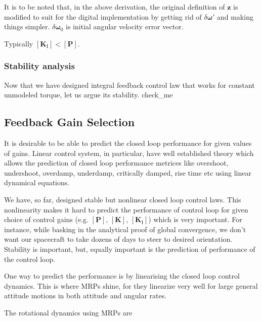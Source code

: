 \documentclass{article}
\begin{document}
It is to be noted that, in the above derivation, the original definition of $\bm{z}$ is modified to suit for the digital implementation by getting rid of $\delta\bm{\omega}'$ and making things simpler. $\delta\bm{\omega}_{0}$ is initial angular velocity error vector. 

Typically $[\bm{K}_{\text{I}}]<[\bm{P}]$.

\subsubsection{Stability analysis}

Now that we have designed integral feedback control law that works for constant unmodeled torque, let us argue its stability. check\_me

\subsection{Feedback Gain Selection}

It is desirable to be able to predict the closed loop performance for given values of gains. Linear control system, in particular, have well established theory which allows the prediction of closed loop performance metrices like overshoot, undershoot, overdamp, underdamp, critically damped, rise time etc using linear dynamical equations.

We have, so far, designed stable but nonlinear closed loop control laws. This nonlinearity makes it hard to predict the performance of control loop for given choice of control gains (e.g. $[\bm{P}]$, $[\bm{K}]$, $[\bm{K}_{\text{I}}]$) which is very important. For instance, while basking in the analytical proof of global convergence, we don't want our spacecraft to take dozens of days to steer to desired orientation. Stability is important, but, equally important is the prediction of performance of the control loop. 

One way to predict the performance is by linearising the closed loop control dynamics. This is where MRPs shine, for they linearize very well for large general attitude motions in both attitude and angular rates.

The rotational dynamics using MRPs are
\begin{equation*}
  
\end{equation*}
\end{document}
